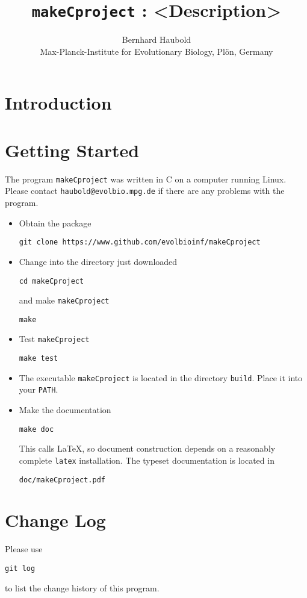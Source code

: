 \documentclass[a4paper, english]{article}
\begin{document}
\title{\texttt{makeCproject} : <Description>}
\author{Bernhard Haubold\\\small Max-Planck-Institute for Evolutionary
  Biology, Pl\"on, Germany}
\date{}
\maketitle
\section{Introduction} 

\section{Getting Started}
The program \texttt{makeCproject} was written in C on a computer running Linux.
Please contact \texttt{haubold@evolbio.mpg.de} if there are any problems
with the program.
\begin{itemize}
\item Obtain the package
\begin{verbatim}
git clone https://www.github.com/evolbioinf/makeCproject
\end{verbatim}
\item Change into the directory just downloaded
\begin{verbatim}
cd makeCproject
\end{verbatim}
and make \texttt{makeCproject}
\begin{verbatim}
make
\end{verbatim}
\item Test \texttt{makeCproject}
\begin{verbatim}
make test
\end{verbatim}
\item The executable \texttt{makeCproject} is located in the
directory \texttt{build}. Place it into your \texttt{PATH}.
\item  Make the documentation
\begin{verbatim}
make doc
\end{verbatim}
This calls \LaTeX{}, so document construction depends on a reasonably
complete \texttt{latex} installation. The typeset documentation is located
in
\begin{verbatim}
doc/makeCproject.pdf
\end{verbatim}
\end{itemize}

\section{Change Log}
Please use
\begin{verbatim}
git log
\end{verbatim}
to list the change history of this program.

\end{document}
